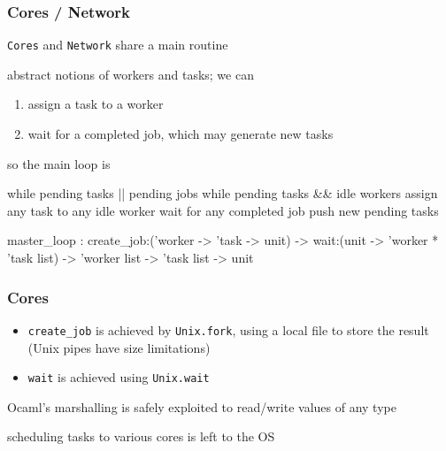 \documentclass{beamer}
\let\emph\alert
\begin{document}
\begin{frame}\frametitle{Cores / Network}

  \texttt{Cores} and \texttt{Network} share a main routine

  abstract notions of \emph{workers} and \emph{tasks}; we can
  \begin{enumerate}
  \item assign a task to a worker
  \item wait for a completed job, which may generate new tasks
  \end{enumerate}


  so the main loop is
  \begin{lightblue-tt}
    while pending tasks || pending jobs
      while pending tasks && idle workers
        assign any task to any idle worker
      wait for any completed job
        push new pending tasks
  \end{lightblue-tt}


  \begin{ocaml}
master_loop : 
  create_job:('worker -> 'task -> unit) -> 
  wait:(unit -> 'worker * 'task list) -> 
  'worker list -> 'task list -> unit
  \end{ocaml}
\end{frame}

\begin{frame}\frametitle{Cores}
  \begin{itemize}\item 
    \texttt{create\_job} is achieved by \texttt{Unix.fork}, using a
    local file to store the result (Unix pipes have size limitations)

  \item 
    \texttt{wait} is achieved using \texttt{Unix.wait}
  \end{itemize}



  Ocaml's marshalling is safely exploited to read/write values of any type


  scheduling tasks to various cores is left to the OS
\end{frame}
\end{document}
